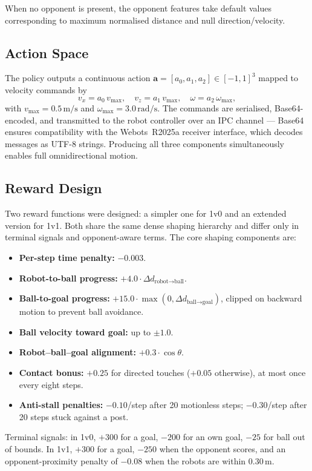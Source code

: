 \documentclass[conference]{IEEEtran}
\begin{document}
When no opponent is present, the opponent features take default values
corresponding to maximum normalised distance and null direction/velocity.

\subsection{Action Space}
The policy outputs a continuous action $\mathbf{a} = [a_0, a_1, a_2] \in [-1,1]^3$
mapped to velocity commands by
\begin{equation}
v_x = a_0\,v_{\max}, \quad v_z = a_1\,v_{\max}, \quad \omega = a_2\,\omega_{\max},
\end{equation}
with $v_{\max} = 0.5\,\mathrm{m/s}$ and $\omega_{\max} = 3.0\,\mathrm{rad/s}$. The
commands are serialised, Base64-encoded, and transmitted to the robot controller
over an IPC channel — Base64 ensures compatibility with the Webots~R2025a receiver
interface, which decodes messages as UTF-8 strings. Producing all three components
simultaneously enables full omnidirectional motion.

\subsection{Reward Design}
Two reward functions were designed: a simpler one for 1v0 and an extended version
for 1v1. Both share the same dense shaping hierarchy and differ only in terminal
signals and opponent-aware terms. The core shaping components are:
\begin{itemize}
    \item \textbf{Per-step time penalty:} $-0.003$.
    \item \textbf{Robot-to-ball progress:} $+4.0 \cdot \Delta d_{\text{robot}\to\text{ball}}$.
    \item \textbf{Ball-to-goal progress:} $+15.0 \cdot \max(0,\Delta d_{\text{ball}\to\text{goal}})$, clipped on backward motion to prevent ball avoidance.
    \item \textbf{Ball velocity toward goal:} up to $\pm1.0$.
    \item \textbf{Robot--ball--goal alignment:} $+0.3 \cdot \cos\theta$.
    \item \textbf{Contact bonus:} $+0.25$ for directed touches ($+0.05$ otherwise), at most once every eight steps.
    \item \textbf{Anti-stall penalties:} $-0.10$/step after 20 motionless steps; $-0.30$/step after 20 steps stuck against a post.
\end{itemize}
Terminal signals: in 1v0, $+300$ for a goal, $-200$ for an own goal, $-25$ for
ball out of bounds. In 1v1, $+300$ for a goal, $-250$ when the opponent scores, and
an opponent-proximity penalty of $-0.08$ when the robots are within $0.30\,\mathrm{m}$.
\end{document}
